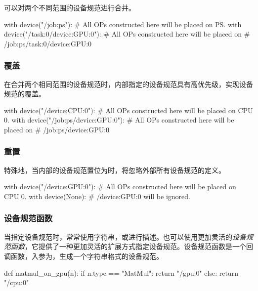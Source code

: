 \begin{content}
可以对两个不同范围的设备规范进行合并。

\begin{leftbar}
\begin{python}
with device("/job:ps"):
  # All OPs constructed here will be placed on PS.
  with device("/task:0/device:GPU:0"):
    # All OPs constructed here will be placed on
    # /job:ps/task:0/device:GPU:0
\end{python}
\end{leftbar}

\subsubsection{覆盖}

在合并两个相同范围的设备规范时，内部指定的设备规范具有高优先级，实现设备规范的覆盖。

\begin{leftbar}
\begin{python}
with device("/device:CPU:0"):
  # All OPs constructed here will be placed on CPU 0.
  with device("/job:ps/device:GPU:0"):
    # All OPs constructed here will be placed on
    # /job:ps/device:GPU:0
\end{python}
\end{leftbar}

\subsubsection{重置}

特殊地，当内部的设备规范置位为时，将忽略外部所有设备规范的定义。

\begin{leftbar}
\begin{python}
with device("/device:GPU:0"):
  # All OPs constructed here will be placed on CPU 0.
  with device(None):
    # /device:GPU:0 will be ignored.
\end{python}
\end{leftbar}

\subsubsection{设备规范函数}

当指定设备规范时，常常使用字符串，或进行描述。也可以使用更加灵活的\emph{设备规范函数}，它提供了一种更加灵活的扩展方式指定设备规范。设备规范函数是一个回调函数，入参为，生成一个字符串格式的设备规范。

\begin{leftbar}
\begin{python}
def matmul_on_gpu(n):
 if n.type == "MatMul":
   return "/gpu:0"
 else:
   return "/cpu:0"


\end{python}
\end{leftbar}
\end{content}
